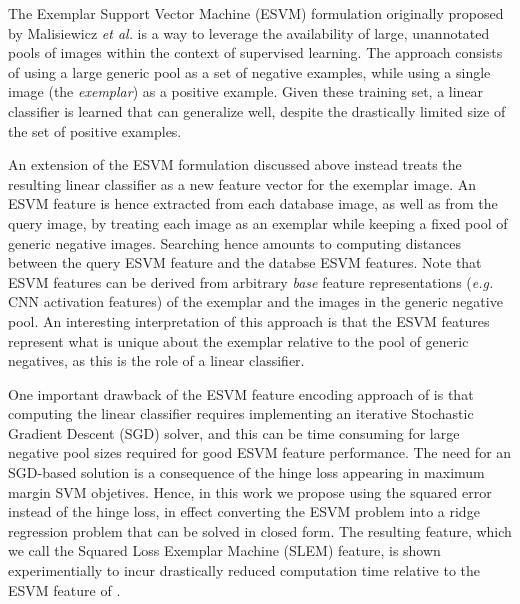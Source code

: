 The Exemplar Support Vector Machine (ESVM) formulation originally proposed by Malisiewicz {\it et al.} \cite{Malisiewicza} is a way to leverage the availability of large, unannotated pools of images within the context of supervised learning. The approach consists of using a large generic pool as a set of negative examples, while using a single image (the \emph{exemplar}) as a positive example. Given these training set, a linear classifier is learned that can  generalize well, despite the drastically limited size of the set of positive examples. 

An extension \cite{ZePe15} of the ESVM formulation discussed above instead treats the resulting linear classifier as a new feature vector for the exemplar image. %
An ESVM feature is hence extracted from each database image, as well as from the query image, by treating each image as an exemplar while keeping a fixed pool of generic negative images. Searching hence amounts to computing distances between the query ESVM feature and the databse ESVM features. Note that ESVM features can be derived from arbitrary \emph{base} feature representations ({\it e.g.} CNN activation features) of the exemplar and the images in the generic negative pool. An interesting interpretation of this approach is that the ESVM features represent what is unique about the exemplar relative to the pool of generic negatives, as this is the role of a linear classifier.

One important drawback of the ESVM feature encoding approach of \cite{ZePe15} is that computing the linear classifier requires implementing an iterative Stochastic Gradient Descent (SGD) solver, and this can be time consuming for large negative pool sizes required for good ESVM feature performance. The need for an SGD-based solution is a consequence of the hinge loss appearing in maximum margin SVM objetives. Hence, in this work we  propose using the squared error instead of the hinge loss, in effect converting the ESVM problem into a ridge regression problem that can be solved in closed form. The resulting feature, which we call the Squared Loss Exemplar Machine (SLEM) feature, is shown experimentially to incur drastically reduced computation time relative to the ESVM feature of \cite{ZePe15}. 

